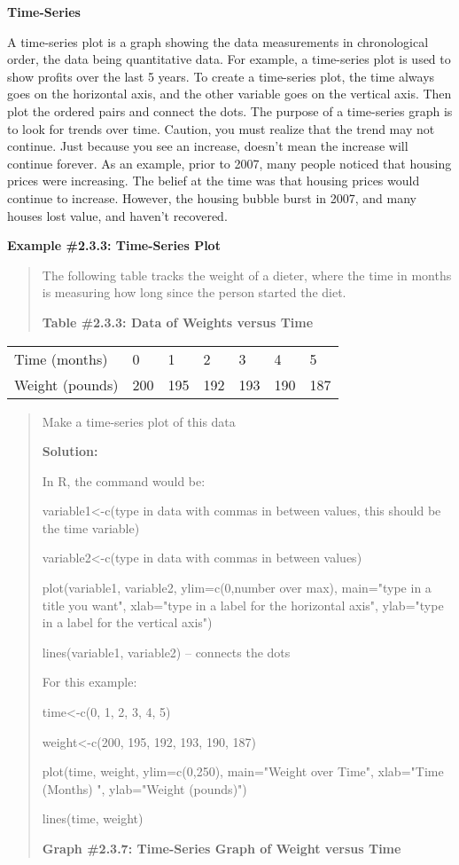 \documentclass[]{book}
\begin{document}
\textbf{Time-Series }

A time-series plot is a graph showing the data measurements in
chronological order, the data being quantitative data. For example, a
time-series plot is used to show profits over the last 5 years. To
create a time-series plot, the time always goes on the horizontal axis,
and the other variable goes on the vertical axis. Then plot the ordered
pairs and connect the dots. The purpose of a time-series graph is to
look for trends over time. Caution, you must realize that the trend may
not continue. Just because you see an increase, doesn't mean the
increase will continue forever. As an example, prior to 2007, many
people noticed that housing prices were increasing. The belief at the
time was that housing prices would continue to increase. However, the
housing bubble burst in 2007, and many houses lost value, and haven't
recovered.

\textbf{Example \#2.3.3: Time-Series Plot}

\begin{quote}
The following table tracks the weight of a dieter, where the time in
months is measuring how long since the person started the diet.

\textbf{Table \#2.3.3: Data of Weights versus Time}
\end{quote}

\begin{longtable}[]{@{}lllllll@{}}
\toprule
\endhead
Time (months) & 0 & 1 & 2 & 3 & 4 & 5\tabularnewline
Weight (pounds) & 200 & 195 & 192 & 193 & 190 & 187\tabularnewline
\bottomrule
\end{longtable}

\begin{quote}
Make a time-series plot of this data

\textbf{Solution:}

In R, the command would be:

variable1\textless{}-c(type in data with commas in between values, this should
be the time variable)

variable2\textless{}-c(type in data with commas in between values)

plot(variable1, variable2, ylim=c(0,number over max), main="type in a
title you want", xlab="type in a label for the horizontal axis",
ylab="type in a label for the vertical axis")

lines(variable1, variable2) -- connects the dots

For this example:

time\textless{}-c(0, 1, 2, 3, 4, 5)

weight\textless{}-c(200, 195, 192, 193, 190, 187)

plot(time, weight, ylim=c(0,250), main="Weight over Time",
xlab="Time (Months) ", ylab="Weight (pounds)")

lines(time, weight)

\textbf{Graph \#2.3.7: Time-Series Graph of Weight versus Time}
\end{quote}
\end{document}
